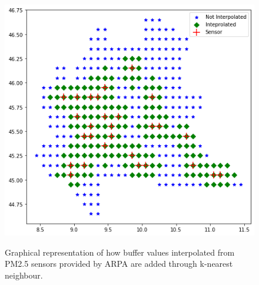 \begin{figure}[H] \centering
{\includegraphics[scale=0.45]{images/buffer.png}}
 { \caption{Graphical representation of how buffer values interpolated from PM2.5 sensors provided by ARPA are added through k-nearest neighbour.}}
\end{figure}
